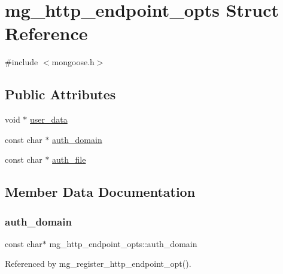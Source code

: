 \hypertarget{structmg__http__endpoint__opts}{}\section{mg\+\_\+http\+\_\+endpoint\+\_\+opts Struct Reference}
\label{structmg__http__endpoint__opts}


{\ttfamily \#include $<$mongoose.\+h$>$}

\subsection*{Public Attributes}
\begin{DoxyCompactItemize}
\item 
void $\ast$ \hyperlink{structmg__http__endpoint__opts_acdb6a63492d91f7e1c4f34242ba6be1d_acdb6a63492d91f7e1c4f34242ba6be1d}{user\+\_\+data}
\item 
const char $\ast$ \hyperlink{structmg__http__endpoint__opts_a5af8bb0311abbac3f9388c4b95210dac_a5af8bb0311abbac3f9388c4b95210dac}{auth\+\_\+domain}
\item 
const char $\ast$ \hyperlink{structmg__http__endpoint__opts_a57ae875a1cc356870d396f3d864d2fc8_a57ae875a1cc356870d396f3d864d2fc8}{auth\+\_\+file}
\end{DoxyCompactItemize}


\subsection{Member Data Documentation}
\mbox{\label{structmg__http__endpoint__opts_a5af8bb0311abbac3f9388c4b95210dac_a5af8bb0311abbac3f9388c4b95210dac}} 
\subsubsection{\texorpdfstring{auth\+\_\+domain}{auth\_domain}}
{\footnotesize\ttfamily const char$\ast$ mg\+\_\+http\+\_\+endpoint\+\_\+opts\+::auth\+\_\+domain}



Referenced by mg\+\_\+register\+\_\+http\+\_\+endpoint\+\_\+opt().

